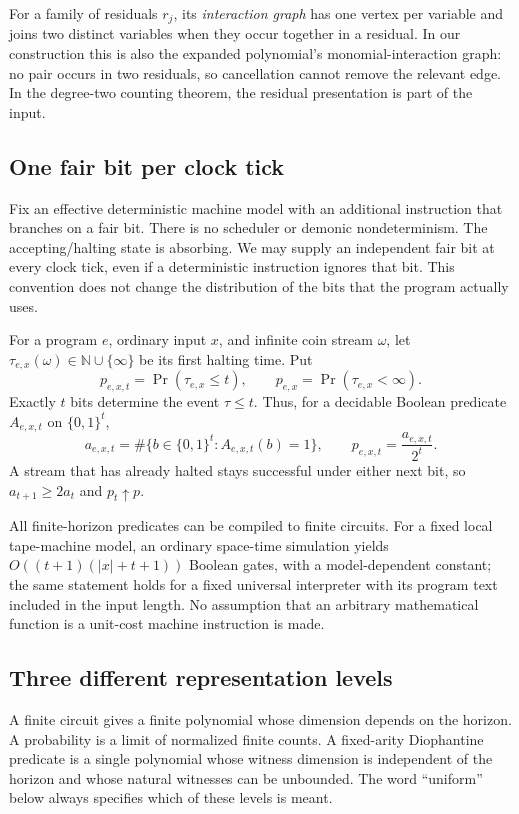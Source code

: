 \documentclass[11pt,letterpaper]{article}
\numberwithin{equation}{section}
\theoremstyle{definition}
\theoremstyle{remark}
\newcommand{\N}{\mathbb N}
\newcommand{\Bit}{\{0,1\}}
\newcommand{\Prob}{\Pr}
\begin{document}
For a family of residuals $r_j$, its \emph{interaction graph} has one vertex
per variable and joins two distinct variables when they occur together in a
residual. In our construction this is also the expanded polynomial's
monomial-interaction graph: no pair occurs in two residuals, so cancellation
cannot remove the relevant edge. In the degree-two counting theorem, the
residual presentation is part of the input.

\subsection{One fair bit per clock tick}
Fix an effective deterministic machine model with an additional instruction
that branches on a fair bit. There is no scheduler or demonic
nondeterminism. The accepting/halting state is absorbing. We may supply an
independent fair bit at every clock tick, even if a deterministic instruction
ignores that bit. This convention does not change the distribution of the
bits that the program actually uses.

For a program $e$, ordinary input $x$, and infinite coin stream $\omega$, let
$\tau_{e,x}(\omega)\in\N\cup\{\infty\}$ be its first halting time. Put
\begin{equation}\label{pqc:ql:eq:pt}
 p_{e,x,t}=\Prob(\tau_{e,x}\le t),\qquad
 p_{e,x}=\Prob(\tau_{e,x}<\infty).
\end{equation}
Exactly $t$ bits determine the event $\tau\le t$. Thus, for a decidable
Boolean predicate $A_{e,x,t}$ on $\Bit^t$,
\begin{equation}\label{pqc:ql:eq:at}
 a_{e,x,t}=\#\{b\in\Bit^t:A_{e,x,t}(b)=1\},\qquad
 p_{e,x,t}=\frac{a_{e,x,t}}{2^t}.
\end{equation}
A stream that has already halted stays successful under either next bit,
so $a_{t+1}\ge 2a_t$ and $p_t\uparrow p$.

All finite-horizon predicates can be compiled to finite circuits. For a
fixed local tape-machine model, an ordinary space-time simulation yields
$O((t+1)(|x|+t+1))$ Boolean gates, with a model-dependent constant; the same
statement holds for a fixed universal interpreter with its program text
included in the input length. No assumption that an arbitrary mathematical
function is a unit-cost machine instruction is made.

\subsection{Three different representation levels}
A finite circuit gives a finite polynomial whose dimension depends on the
horizon. A probability is a limit of normalized finite counts. A fixed-arity
Diophantine predicate is a single polynomial whose witness dimension is
independent of the horizon and whose natural witnesses can be unbounded.
The word ``uniform'' below always specifies which of these levels is meant.
\end{document}
